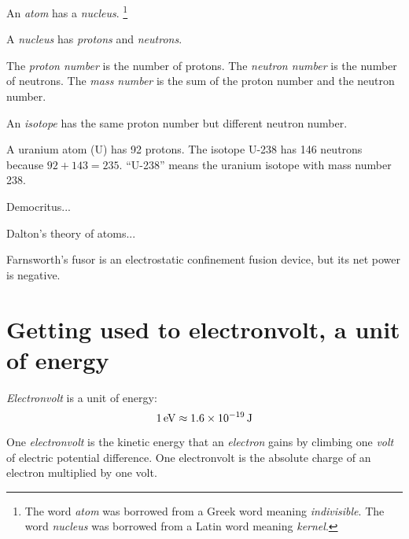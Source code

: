 An \emph{atom} has a \emph{nucleus}.%
\footnote{The word \emph{atom} was borrowed from a Greek word meaning \emph{indivisible}.
The word \emph{nucleus} was borrowed from a Latin word meaning \emph{kernel}.}

A \emph{nucleus} has \emph{protons} and \emph{neutrons}.

The \emph{proton number} is the number of protons.
The \emph{neutron number} is the number of neutrons.
The \emph{mass number} is the sum of the proton number and the neutron number.

An \emph{isotope} has the same proton number but different neutron number.

A uranium atom (U) has 92 protons.
The isotope U-238 has 146 neutrons because \(92 + 143 = 235\).
\enquote{U-238} means the uranium isotope with mass number 238.


Democritus...

Dalton's theory of atoms...

Farnsworth's fusor is an electrostatic confinement fusion device, but its net power is negative.

\section{Getting used to electronvolt, a unit of energy}

%
\emph{Electronvolt} is a unit of energy:
\begin{equation}
    \SI{1}{eV} \approx \SI{1.6E-19}{J}
\end{equation}

One \emph{electronvolt} is the kinetic energy that an \emph{electron}
gains by climbing one \emph{volt} of electric potential difference.
One electronvolt is the absolute charge of an electron multiplied by one volt.

